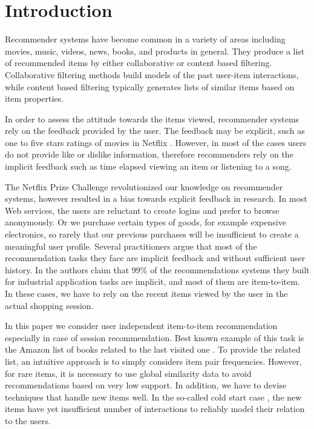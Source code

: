 \section{Introduction}

Recommender systems \cite{ricci2011introduction} have become common in a variety of areas including movies, music, videos, news, books, and products in general.
They produce a list of recommended items by either collaborative or content based filtering.
Collaborative filtering methods \cite{amazon-recommender,sarwar01item} build models of the past user-item interactions, while content based filtering \cite{lops2011content} typically generates lists of similar items
based on item properties.

In order to assess the attitude towards the items viewed, recommender systems rely on the feedback provided by the user.
The feedback may be explicit, such as one to five stars ratings of movies in Netflix \cite{adhikari2012unreeling}. 
However, in most of the cases users do not provide like or dislike information, therefore recommenders rely on the implicit feedback such as time elapsed viewing an item or listening to a song.  

The Netflix Prize Challenge \cite{bennett2007netflix,koren2009bellkor} revolutionized our knowledge on recommender systems, however resulted in a bias towards explicit feedback in research.
In most Web services, the users are reluctant to create logins and prefer to browse anonymously.  Or we purchase certain types of goods, for example expensive electronics, so rarely that our previous purchases will be insufficient to create a meaningful user profile.
Several practitioners \cite{koenigstein2013towards} argue that most of the recommendation tasks they face are implicit feedback and without sufficient user history.
In \cite{pilaszy2015neighbor} the authors claim that 99\% of the recommendations systems they built for industrial application tasks are implicit, and most of them are item-to-item. 
In these cases, we have to rely on the recent items viewed by the user in the actual shopping session.


In this paper we consider user independent item-to-item recommendation \cite{sarwar01item,amazon-recommender} especially in case of session recommendation. 
Best known example of this task is the Amazon list of books related to the last visited one \cite{amazon-recommender}. 
To provide the related list, an intuitive approach is to simply considers item pair frequencies.  However, for rare items, it is necessary to use global similarity data to avoid recommendations based on very low support.
In addition, we have to devise techniques that handle new items well. In the so-called cold start case \cite{schein2002methods}, the new items have yet insufficient number of interactions to reliably model their relation to the users.

